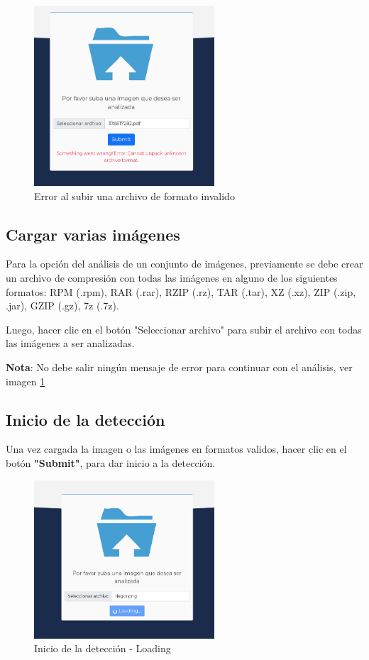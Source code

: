 \begin{figure}[h!]
    \centering
    \includegraphics[width=0.6\textwidth]{img/FE - upload error.png} 
    \caption{Error al subir una archivo de formato invalido}
    \label{fig:error}
\end{figure}

\subsection{Cargar varias imágenes} 

Para la opción del análisis de un conjunto de imágenes, previamente se debe crear un archivo de compresión con todas las imágenes en alguno de los siguientes formatos: RPM (.rpm), RAR (.rar), RZIP (.rz), TAR (.tar), XZ (.xz), ZIP (.zip, .jar), GZIP (.gz), 7z (.7z).

Luego, hacer clic en el botón "Seleccionar archivo" para subir el archivo con todas las imágenes a ser analizadas.

\textbf{Nota}: No debe salir ningún mensaje de error para continuar con el análisis,  ver imagen \ref{fig:error}

\subsection{Inicio de la detección} 

Una vez cargada la imagen o las imágenes en formatos validos, hacer clic en el botón \textbf{"Submit"}, para dar inicio a la detección. 

\begin{figure}[h!]
    \centering
    \includegraphics[width=0.6\textwidth]{img/FE - detection loading.png}
    \caption{Inicio de la detección - Loading}
    \label{fig:loading}
\end{figure}

